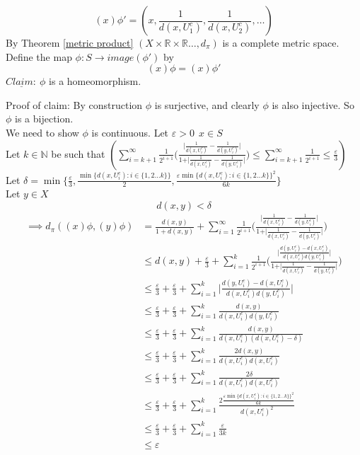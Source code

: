 \documentclass{report}
\begin{document}
$$(x)\phi' = (x,\frac{1}{d(x,U_1^c)},\frac{1}{d(x,U_2^c)},\ldots )$$
By Theorem \ref{metric product} $(X \times \mathbb{R} \times \mathbb{R} \ldots ,d_\pi)$ is a complete metric space.\\
Define the map $\phi:S\rightarrow image(\phi')$ by
$$(x)\phi = (x)\phi'$$
$\underline{Claim:}\ \phi$ is a homeomorphism.\par
Proof of claim: By construction $\phi$ is surjective, and clearly $\phi$ is also injective. So $\phi$ is a bijection.\\
We need to show $\phi$ is continuous.
Let $\varepsilon>0\ \ x\in S$\\
Let $k\in\mathbb{N}$ be such that $(\sum_{i=k+1}^{\infty}{\frac{1}{2^{i+1}}\Big(\frac{\vert \frac{1}{d(x,U_i^c)}-\frac{1}{d(y,U_i^c)}\vert }{1+\vert \frac{1}{d(x,U_i^c)}-\frac{1}{d(y,U_i^c)}\vert }}\Big)\leq \sum_{i=k+1}^{\infty}{\frac{1}{2^{i+1}}} \leq \frac{\varepsilon}{3})$\\
Let $\delta = \min{\{\frac{\varepsilon}{3},\frac{\min\{d(x,U_i^c):i \in \{1,2 \ldots k\}\}}{2},\frac{\varepsilon \min\{d(x,U_i^c):i \in \{1,2 \ldots k\}\}^2}{6k}\}}$\\
Let $y\in X$
$$d(x,y)<\delta$$
\begin{align*}
\implies d_\pi ((x)\phi,(y)\phi) &=\frac{d(x,y)}{1+d(x,y)}+\sum_{i=1}^{\infty}{\frac{1}{2^{i+1}}\Big(\frac{\vert \frac{1}{d(x,U_i^c)}-\frac{1}{d(y,U_i^c)}\vert}{1+\vert \frac{1}{d(x,U_i^c)}-\frac{1}{d(y,U_i^c)}\vert}}\Big)\\
&\leq d(x,y)+\frac{\varepsilon}{3} + \sum_{i=1}^{k}{\frac{1}{2^{i+1}}\Big(\frac{\vert\frac{d(y,U_i^c)-d(x,U_i^c)}{d(x,U_i^c)d(y,U_i^c)}\vert}{1+\vert \frac{1}{d(x,U_i^c)}-\frac{1}{d(y,U_i^c)}\vert}}\Big)\\
&\leq \frac{\varepsilon}{3}+\frac{\varepsilon}{3} + \sum_{i=1}^{k}{\vert\frac{d(y,U_i^c)-d(x,U_i^c)}{d(x,U_i^c)d(y,U_i^c)}\vert}\\
&\leq \frac{\varepsilon}{3}+\frac{\varepsilon}{3} + \sum_{i=1}^{k}{\frac{d(x,y)}{d(x,U_i^c)d(y,U_i^c)}}\\
&\leq \frac{\varepsilon}{3}+\frac{\varepsilon}{3} + \sum_{i=1}^{k}{\frac{d(x,y)}{d(x,U_i^c)(d(x,U_i^c)-\delta)}}\\
&\leq \frac{\varepsilon}{3}+\frac{\varepsilon}{3} + \sum_{i=1}^{k}{\frac{2d(x,y)}{d(x,U_i^c)d(x,U_i^c)}}\\
&\leq \frac{\varepsilon}{3}+\frac{\varepsilon}{3} + \sum_{i=1}^{k}{\frac{2\delta}{d(x,U_i^c)d(x,U_i^c)}}\\
&\leq \frac{\varepsilon}{3}+\frac{\varepsilon}{3} + \sum_{i=1}^{k}{\frac{2\frac{\varepsilon \min\{d(x,U_i^c):i \in \{1,2 \ldots k\}\}^2}{6k}}{d(x,U_i^c)^2}}\\
&\leq \frac{\varepsilon}{3}+\frac{\varepsilon}{3} + \sum_{i=1}^{k}{\frac{\varepsilon}{3k}}\\
&\leq \varepsilon
\end{align*}
\end{document}
